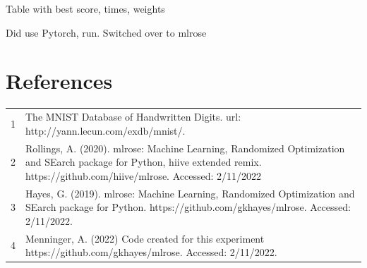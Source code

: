 \documentclass[letterpaper]{article} %
\begin{document}
Table with best score, times, weights

Did use Pytorch, run.  Switched over to mlrose


\section{References}
\begin{tabular}{l p{2.75in}}
\\
1 & The MNIST Database of Handwritten Digits. url: http://yann.lecun.com/exdb/mnist/.
\\
2 & Rollings, A. (2020). mlrose: Machine Learning, Randomized Optimization and SEarch package for Python, hiive extended remix. https://github.com/hiive/mlrose. Accessed: 2/11/2022
\\
3 & Hayes, G. (2019). mlrose: Machine Learning, Randomized Optimization and SEarch package for Python. https://github.com/gkhayes/mlrose. Accessed: 2/11/2022.
\\
4 & Menninger, A. (2022)  Code created for this experiment https://github.com/gkhayes/mlrose. Accessed: 2/11/2022.
\end{tabular}
\end{document}
